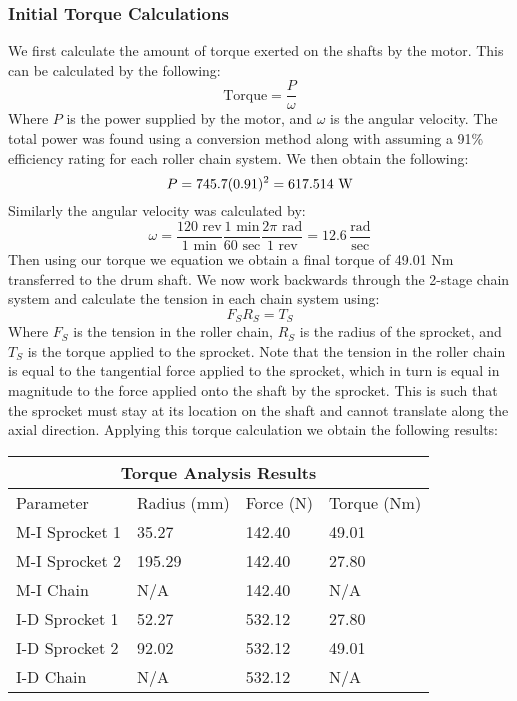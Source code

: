 \documentclass[letterpaper,12pt]{article}
\begin{document}
\subsubsection{Initial Torque Calculations}
We first calculate the amount of torque exerted on the shafts by the motor. This can be calculated by the following:
\begin{equation*}
    \text{Torque} = \dfrac{P}{\omega}
\end{equation*}
Where $P$ is the power supplied by the motor, and $\omega$ is the angular velocity. The total power was found using a conversion method along with assuming a 91\% efficiency rating for each roller chain system. We then obtain the following:
\begin{equation*}
    P = 745.7(0.91)^2 = 617.514 \text{ W} \\
\end{equation*}
Similarly the angular velocity was calculated by:
\begin{equation*}
    \omega = \dfrac{120 \text{ rev}}{1 \text{ min}}\dfrac{1 \text{ min}}{60 \text{ sec}}\dfrac{2\pi \text{ rad}}{1 \text{ rev}} = 12.6\, \dfrac{\text{rad}}{\text{sec}}
\end{equation*}
Then using our torque we equation we obtain a final torque of 49.01 Nm transferred to the drum shaft. We now work backwards through the 2-stage chain system and calculate the tension in each chain system using:
\begin{equation*}
    F_SR_S = T_S
\end{equation*}
Where $F_S$ is the tension in the roller chain, $R_S$ is the radius of the sprocket, and $T_S$ is the torque applied to the sprocket. Note that the tension in the roller chain is equal to the tangential force applied to the sprocket, which in turn is equal in magnitude to the force applied onto the shaft by the sprocket. This is such that the sprocket must stay at its location on the shaft and cannot translate along the axial direction. Applying this torque calculation we obtain the following results:
\begin{center}
	\begin{tabular}{ |p{3cm}||p{2.5cm}|p{2.5cm}|p{2.5cm}|  }
		\hline
		\multicolumn{4}{|c|}{Torque Analysis Results} \\
		\hline
		Parameter & Radius (mm) & Force (N) & Torque (Nm)\\
		\hline
		M-I Sprocket 1 & 35.27 & 142.40 & 49.01 \\
		M-I Sprocket 2 & 195.29 & 142.40 & 27.80 \\
		M-I Chain & N/A & 142.40 & N/A \\
		I-D Sprocket 1 & 52.27 & 532.12 & 27.80 \\
		I-D Sprocket 2 & 92.02 & 532.12 & 49.01 \\
		I-D Chain & N/A & 532.12 & N/A \\
		\hline
	\end{tabular}
\end{center}
\end{document}
